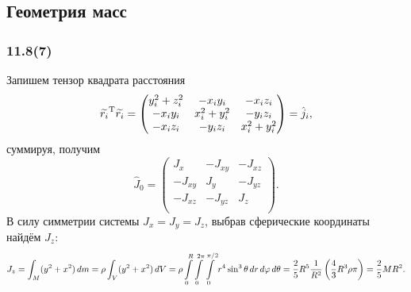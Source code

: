 \subsection{Геометрия масс}

\subsubsection*{11.8(7)}
Запишем тензор квадрата расстояния
\begin{equation}
\label{t1}
    \widetilde{r_i}^{\text{T}} \widetilde{r_i} = \begin{pmatrix}
        y_i^2 + z_i^2 & -x_i y_i & - x_i z_i \\
        -x_i y_i & x_i^2 + y_i^2 & - y_i z_i \\
        -x_i z_i & -y_i z_i & x_i^2 + y_i^2 \\
    \end{pmatrix} = \hat j_i,
\end{equation}
суммируя, получим
\begin{equation}
\label{t2}
    \hat J_0 = \begin{pmatrix}
        J_x & - J_{xy} & -J_{xz} \\
        -J_{xy} & J_y & -J_{yz} \\
        -J_{xz} & -J_{yz} & J_z \\
    \end{pmatrix}.
\end{equation}
В силу симметрии системы $J_x = J_y = J_z$, выбрав сферические координаты найдём $J_z$:
\begin{equation}
\label{t3}
    J_z = \int_M (y^2 + x^2) \, d m = \rho \int_V (y^2 + x^2) \, d V =
    \rho \int\limits_0^R \int\limits_0^{2\pi} \int\limits_0^{\pi/2} r^4 \sin^3 \theta \, d r \, d \varphi \, d \theta = 
    \frac{2}{5} R^5 \frac{1}{R^2}  \left(\frac{4}{3} R^3 \rho \pi \right) = \frac{2}{5} M R^2.
\end{equation}


